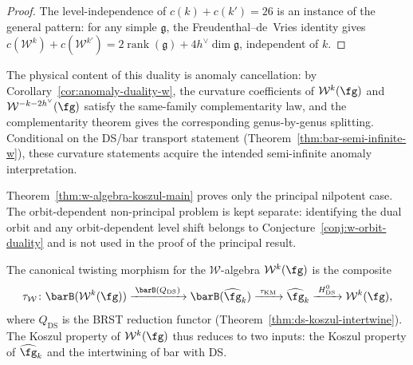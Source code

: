 \begin{proof}
The level-independence of $c(k) + c(k') = 26$ is an instance of the
general pattern: for any simple $\mathfrak{g}$, the Freudenthal--de~Vries
identity gives $c(\mathcal{W}^k) + c(\mathcal{W}^{k'})
= 2\operatorname{rank}(\mathfrak{g}) + 4h^\vee\dim\mathfrak{g}$,
independent of $k$.

\end{proof}

\begin{remark}
\label{rem:w-anomaly-cancellation}
The physical content of this duality is anomaly cancellation:
by Corollary~\ref{cor:anomaly-duality-w}, the curvature
coefficients of $\mathcal{W}^k(\fg)$ and
$\mathcal{W}^{-k-2h^\vee}(\fg)$ satisfy the same-family
complementarity law, and the complementarity theorem gives the
corresponding genus-by-genus splitting.  Conditional on the
DS/bar transport statement
\textup{(}Theorem~\textup{\ref{thm:bar-semi-infinite-w}}\textup{)},
these curvature statements acquire the intended semi-infinite
anomaly interpretation.
\end{remark}

\begin{remark}
\label{rem:w-principal-theorem-scope}
Theorem~\ref{thm:w-algebra-koszul-main} proves only the principal
nilpotent case.  The orbit-dependent non-principal problem is kept
separate: identifying the dual orbit and any orbit-dependent level
shift belongs to Conjecture~\ref{conj:w-orbit-duality} and is not
used in the proof of the principal result.
\end{remark}

\begin{remark}
\label{rem:w-twisting-morphism}
The canonical twisting morphism for the $\mathcal{W}$-algebra
$\mathcal{W}^k(\fg)$ is the composite
\[
\tau_{\mathcal{W}} \colon
\barB(\mathcal{W}^k(\fg))
\xrightarrow{\;\barB(Q_{\mathrm{DS}})\;}
\barB(\widehat{\fg}_k)
\xrightarrow{\;\tau_{\mathrm{KM}}\;}
\widehat{\fg}_k
\xrightarrow{\;H^0_{\mathrm{DS}}\;}
\mathcal{W}^k(\fg),
\]
where $Q_{\mathrm{DS}}$ is the BRST reduction functor
(Theorem~\ref{thm:ds-koszul-intertwine}).  The Koszul property
of $\mathcal{W}^k(\fg)$ thus reduces to two inputs: the Koszul
property of $\widehat{\fg}_k$ and the intertwining of bar with DS.
\end{remark}

